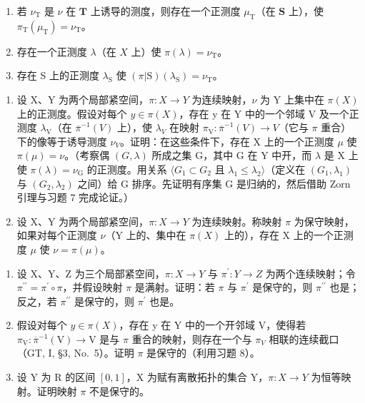 \begin{enumerate}
\def\labelenumi{\alph{enumi})}
\item
  若 \(\nu_{\mathrm{T}}\) 是 \(\nu\) 在 \(\mathbf{T}\) 上诱导的测度，则存在一个正测度 \(\mu_{\mathrm{T}}\)（在 \(\mathbf{S}\) 上），使 \(\pi_{\mathrm{T}}(\mu_{\mathrm{T}}) = \nu_{\mathrm{T}}\)。
\item
  存在一个正测度 \(\lambda\)（在 \(X\) 上）使 \(\pi (\lambda) = \nu_{\mathrm{T}}\)。
\item
  存在 S 上的正测度 \(\lambda_{\mathrm{S}}\) 使 \((\pi|\mathrm{S})(\lambda_{\mathrm{S}})=\nu_{\mathrm{T}}\)。
\end{enumerate}

\begin{enumerate}
\def\labelenumi{\arabic{enumi})}
\setcounter{enumi}{7}
\item
  设 X、Y 为两个局部紧空间，\(\pi: X \to Y\) 为连续映射，\(\nu\) 为 Y 上集中在 \(\pi(X)\) 上的正测度。假设对每个 \(y \in \pi(X)\)，存在 y 在 Y 中的一个邻域 V 及一个正测度 \(\lambda_{\mathrm{V}}\)（在 \(\overline{\pi}^{-1}(V)\) 上），使 \(\lambda_{V}\) 在映射 \(\pi_{\mathrm{V}}: \overline{\pi}^{-1}(V) \to V\)（它与 \(\pi\) 重合）下的像等于诱导测度 \(\nu_{V}\)。证明：在这些条件下，存在 X 上的一个正测度 \(\mu\) 使 \(\pi(\mu) = \nu\)。（考察偶 \((G, \lambda)\) 所成之集 G，其中 G 在 Y 中开，而 \(\lambda\) 是 X 上使 \(\pi(\lambda) = \nu_{\mathrm{G}}\) 的正测度。用关系 \(\langle G_{1} \subset G_{2} \text{ 且 } \lambda_{1} \leqslant \lambda_{2} \rangle\)（定义在 \((G_{1}, \lambda_{1})\) 与 \((G_{2}, \lambda_{2})\) 之间）给 G 排序。先证明有序集 G 是归纳的，然后借助 Zorn 引理与习题 7 完成论证。）
\item
  设 X、Y 为两个局部紧空间，\(\pi: X \to Y\) 为连续映射。称映射 \(\pi\) 为保守映射，如果对每个正测度 \(\nu\)（Y 上的、集中在 \(\pi(X)\) 上的），存在 X 上的一个正测度 \(\mu\) 使 \(\nu = \pi(\mu)\)。
\end{enumerate}

\begin{enumerate}
\def\labelenumi{\alph{enumi})}
\item
  设 X、Y、Z 为三个局部紧空间，\(\pi:X\to Y\) 与 \(\pi^{\prime}:Y\to Z\) 为两个连续映射；令 \(\pi^{\prime\prime}=\pi^{\prime}\circ\pi\)，并假设映射 \(\pi\) 是满射。证明：若 \(\pi\) 与 \(\pi^{\prime}\) 是保守的，则 \(\pi^{\prime\prime}\) 也是；反之，若 \(\pi^{\prime\prime}\) 是保守的，则 \(\pi^{\prime}\) 也是。
\item
  假设对每个 \(y \in \pi(X)\)，存在 y 在 Y 中的一个开邻域 V，使得若 \(\pi_{\mathrm{V}} : \overline{\pi}^{-1}(\mathrm{V}) \to \mathrm{V}\) 是与 \(\pi\) 重合的映射，则存在一个与 \(\pi_{V}\) 相联的连续截口（GT, I, §3, No.~5）。证明 \(\pi\) 是保守的（利用习题 8）。
\item
  设 Y 为 R 的区间 \([0,1]\)，X 为赋有离散拓扑的集合 Y，\(\pi:X\to Y\) 为恒等映射。证明映射 \(\pi\) 不是保守的。
\end{enumerate}

